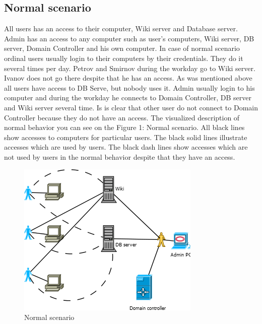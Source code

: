 \subsection{Normal scenario}
All users has an access to their computer, Wiki server and Database server. Admin has an access to any computer such as user's computers, Wiki server, DB server, Domain Controller and his own computer.  In case of normal scenario ordinal users usually login to their computers by their credentials. They do it several times per day. Petrov and Smirnov during the workday go to Wiki server. Ivanov does not go there despite that he has an access. As was mentioned above all users  have access to DB Serve, but nobody uses it. Admin usually login to his computer and during the workday he connects to Domain Controller, DB server and Wiki server several time. Is is clear that other user do not connect to Domain Controller because they do not have an access. The visualized description of normal behavior you can see on the Figure 1: Normal scenario. All black lines show  accesses to computers for particular users. The black solid lines illustrate accesses which are used by users. The black dash lines show accesses which are not used by users in the normal behavior despite that they have an access. 
\begin{figure}[ht!]
\centering
\includegraphics{scenario_normal.png}
\caption{Normal scenario}
\label{overflow}
\end{figure}

